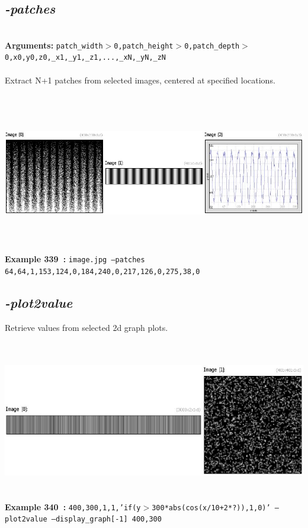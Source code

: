 \documentclass[a4paper,11pt,twoside]{book}
\begin{document}
\subsection{\emph{-patches} }\vspace*{-0.5em}
~\\\textbf{Arguments: } 
{\small \texttt{patch\_width$>$0,patch\_height$>$0,patch\_depth$>$0,x0,y0,z0,\_x1,\_y1,\_z1,...,\_xN,\_yN,\_zN}}\\~\\
Extract N+1 patches from selected images, centered at specified locations.
\begin{center}\includegraphics[keepaspectratio=true,height=7cm,width=\textwidth]{img/gmic_def339.jpg}\\
{\footnotesize \textbf{Example 339~:} \texttt{image.jpg --patches 64,64,1,153,124,0,184,240,0,217,126,0,275,38,0}}
\end{center}

\subsection{\emph{-plot2value} }\vspace*{-0.5em}
Retrieve values from selected 2d graph plots.
\begin{center}\includegraphics[keepaspectratio=true,height=7cm,width=\textwidth]{img/gmic_def340.jpg}\\
{\footnotesize \textbf{Example 340~:} \texttt{400,300,1,1,'if(y$>$300*abs(cos(x/10+2*?)),1,0)' --plot2value --display\_graph[-1] 400,300}}
\end{center}
\end{document}
